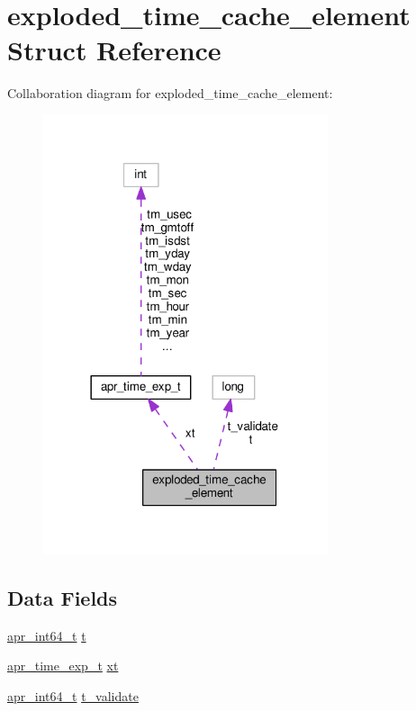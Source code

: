 \hypertarget{structexploded__time__cache__element}{}\section{exploded\+\_\+time\+\_\+cache\+\_\+element Struct Reference}
\label{structexploded__time__cache__element}


Collaboration diagram for exploded\+\_\+time\+\_\+cache\+\_\+element\+:
\nopagebreak
\begin{figure}[H]
\begin{center}
\leavevmode
\includegraphics[width=237pt]{structexploded__time__cache__element__coll__graph}
\end{center}
\end{figure}
\subsection*{Data Fields}
\begin{DoxyCompactItemize}
\item 
\hyperlink{group__apr__platform_ga4b75afbf973dc6c8aea4ae75b044aa08}{apr\+\_\+int64\+\_\+t} \hyperlink{structexploded__time__cache__element_a56a3dc7ba61fbc5dc9470147f626afd1}{t}
\item 
\hyperlink{structapr__time__exp__t}{apr\+\_\+time\+\_\+exp\+\_\+t} \hyperlink{structexploded__time__cache__element_a11c2e64468a4c7ea28a61894b796fa14}{xt}
\item 
\hyperlink{group__apr__platform_ga4b75afbf973dc6c8aea4ae75b044aa08}{apr\+\_\+int64\+\_\+t} \hyperlink{structexploded__time__cache__element_a7c31f8dc437a867e496992097411050d}{t\+\_\+validate}
\end{DoxyCompactItemize}


